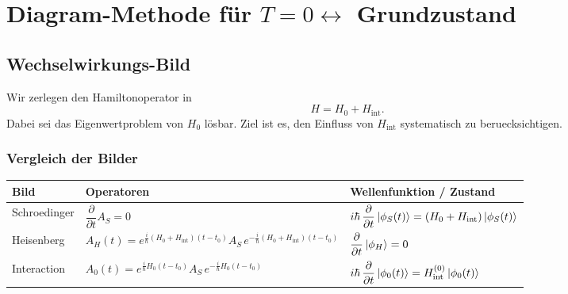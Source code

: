 \section{\texorpdfstring{Diagram-Methode für $T=0 \leftrightarrow$ Grundzustand}{Diagram-Methode für T=0 <-> Grundzustand}}
\subsection{Wechselwirkungs-Bild}

Wir zerlegen den Hamiltonoperator in
\begin{equation}
  H=H_0+H_{\mathrm{int}}.
\end{equation}
Dabei sei das Eigenwertproblem von $H_0$ lösbar.
Ziel ist es, den Einfluss von $H_{\mathrm{int}}$ systematisch zu beruecksichtigen.

\subsubsection*{Vergleich der Bilder}

\begin{center}
  \renewcommand{\arraystretch}{1.4}
  \begin{tabular}{@{}lll@{}}
    \toprule
    Bild         & Operatoren                                                                                                      & Wellenfunktion / Zustand                                                                    \\
    \midrule
    Schroedinger & $\dfrac{\partial}{\partial t}A_S=0$                                                                             & $i\hbar\,\dfrac{\partial}{\partial t}\left|\phi_S(t)\right\rangle=(H_0+H_{\mathrm{int}})\left|\phi_S(t)\right\rangle$ \\
    Heisenberg   & $A_H(t)=e^{\frac{i}{\hbar}(H_0+H_{\mathrm{int}})(t-t_0)}A_S\,e^{-\frac{i}{\hbar}(H_0+H_{\mathrm{int}})(t-t_0)}$ & $\dfrac{\partial}{\partial t}\left|\phi_H\right\rangle=0$                                                \\
    Interaction  & $A_0(t)=e^{\frac{i}{\hbar}H_0(t-t_0)}A_S\,e^{-\frac{i}{\hbar}H_0(t-t_0)}$                                       & $i\hbar\,\dfrac{\partial}{\partial t}\left|\phi_0(t)\right\rangle=H_{\mathrm{int}}^{(0)}\left|\phi_0(t)\right\rangle$ \\
    \bottomrule
  \end{tabular}
\end{center}

